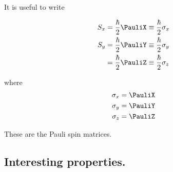 \section{}

It is useful to write

\begin{align}\label{eqn:qmTwoL14:n}
S_x 
&= \frac{\hbar}{2} \PauliX \equiv 
\frac{\hbar}{2} \sigma_x \\
S_y 
&= \frac{\hbar}{2} \PauliY \equiv 
\frac{\hbar}{2} \sigma_y \\
&= \frac{\hbar}{2} \PauliZ \equiv 
\frac{\hbar}{2} \sigma_z 
\end{align}

where
\begin{align}\label{eqn:qmTwoL14:n}
\sigma_x &= \PauliX \\
\sigma_y &= \PauliY \\
\sigma_z &= \PauliZ
\end{align}

These are the Pauli spin matrices.

\subsection{Interesting properties.}

